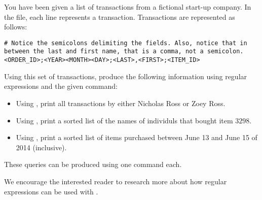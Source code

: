 \begin{problem}
You have been given a list of transactions from a fictional start-up company. In the  file, each line represents a transaction. Transactions are represented as follows:
\begin{lstlisting}
# Notice the semicolons delimiting the fields. Also, notice that in between the last and first name, that is a comma, not a semicolon.
<ORDER_ID>;<YEAR><MONTH><DAY>;<LAST>,<FIRST>;<ITEM_ID>
\end{lstlisting}

Using this set of transactions, produce the following information using regular expressions and the given command:
\begin{itemize}
    \item Using , print all transactions by either Nicholas Ross or Zoey Ross.
    \item Using , print a sorted list of the names of individuls that bought item $3298$.
    \item Using , print a sorted list of items purchased between June 13 and June 15 of 2014 (inclusive).
\end{itemize}
These queries can be produced using one command each.
\end{problem}

We encourage the interested reader to research more about how regular expressions can be used with .
